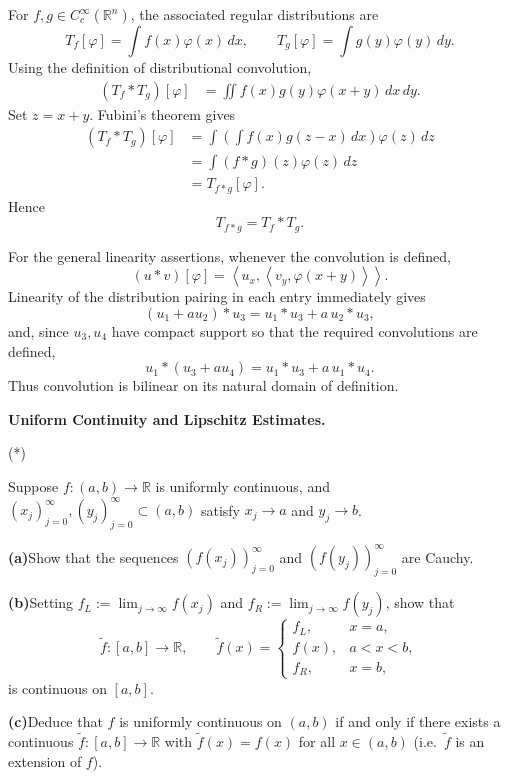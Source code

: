 \begin{solution}
For \(f,g\in C_c^\infty(\mathbb R^n)\), the associated regular distributions are
\[
T_f[\varphi]=\int f(x)\varphi(x)\,dx,
\qquad
T_g[\varphi]=\int g(y)\varphi(y)\,dy.
\]
Using the definition of distributional convolution,
\[
\begin{aligned}
(T_f*T_g)[\varphi]
&=
\iint
f(x)g(y)\varphi(x+y)\,dx\,dy.
\end{aligned}
\]
Set \(z=x+y\). Fubini's theorem gives
\[
\begin{aligned}
(T_f*T_g)[\varphi]
&=
\int
\left(
\int f(x)g(z-x)\,dx
\right)
\varphi(z)\,dz\\
&=
\int
(f*g)(z)\varphi(z)\,dz\\
&=
T_{f*g}[\varphi].
\end{aligned}
\]
Hence
\[
\boxed{T_{f*g}=T_f*T_g.}
\]

For the general linearity assertions, whenever the convolution is defined,
\[
(u*v)[\varphi]
=
\left\langle
u_x,
\left\langle
v_y,\varphi(x+y)
\right\rangle
\right\rangle.
\]
Linearity of the distribution pairing in each entry immediately gives
\[
\boxed{
(u_1+a u_2)*u_3
=
u_1*u_3+a\,u_2*u_3,
}
\]
and, since \(u_3,u_4\) have compact support so that the required convolutions are defined,
\[
\boxed{
u_1*(u_3+a u_4)
=
u_1*u_3+a\,u_1*u_4.
}
\]
Thus convolution is bilinear on its natural domain of definition.
\end{solution}


\begin{problem}[CP-II-0262]
\label{prob:cp-ii-0262}
\textbf{Uniform Continuity and Lipschitz Estimates.}

\hspace*{1.5em}(*)

Suppose $f:(a,b)\to\mathbb{R}$ is uniformly continuous, and $(x_j)_{j=0}^\infty,(y_j)_{j=0}^\infty\subset(a,b)$ satisfy
$x_j\to a$ and $y_j\to b$.

	\renewcommand\labelenumi{(\alph{enumi})}
	\par\smallskip\noindent\textbf{(a)}\quad Show that the sequences $(f(x_j))_{j=0}^\infty$ and $(f(y_j))_{j=0}^\infty$ are Cauchy.

	\par\smallskip\noindent\textbf{(b)}\quad Setting $f_L:=\lim_{j\to\infty}f(x_j)$ and $f_R:=\lim_{j\to\infty}f(y_j)$, show that
	\[
	\tilde f:[a,b]\to\mathbb{R},\qquad
	\tilde f(x)=
	\begin{cases}
		f_L,& x=a,\\
		f(x),& a<x<b,\\
		f_R,& x=b,
	\end{cases}
	\]
	is continuous on $[a,b]$.

	\par\smallskip\noindent\textbf{(c)}\quad Deduce that $f$ is uniformly continuous on $(a,b)$ if and only if there exists a continuous
	$\tilde f:[a,b]\to\mathbb{R}$ with $\tilde f(x)=f(x)$ for all $x\in(a,b)$ (i.e.\ $\tilde f$ is an extension of $f$).
\end{problem}


